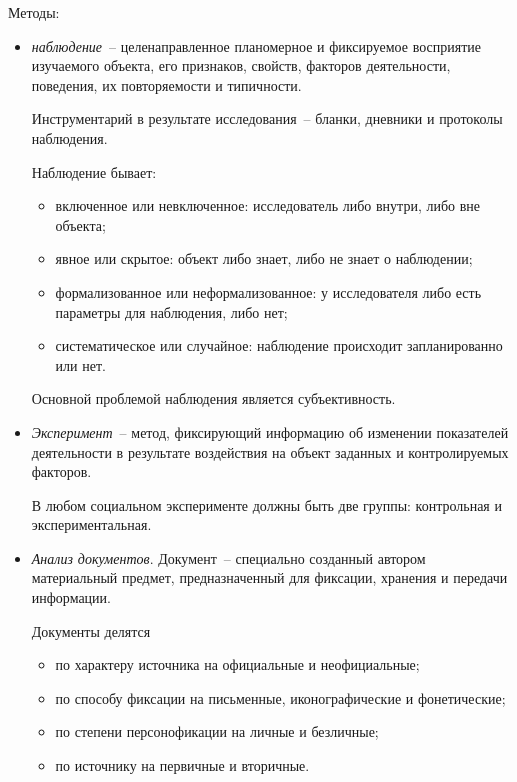   Методы:
  \begin{itemize}
    \item \emph{наблюдение}~-- целенаправленное планомерное и фиксируемое
      восприятие изучаемого объекта, его признаков, свойств, факторов
      деятельности, поведения, их повторяемости и типичности.

      Инструментарий в результате исследования~-- бланки, дневники и протоколы
      наблюдения.

      Наблюдение бывает:
      \begin{itemize}
        \item включенное или невключенное: исследователь либо внутри, либо
          вне объекта;
        \item явное или скрытое: объект либо знает, либо не знает о
          наблюдении;
        \item формализованное или неформализованное: у исследователя либо
          есть параметры для наблюдения, либо нет;
        \item систематическое или случайное: наблюдение происходит
          запланированно или нет.
      \end{itemize}

      Основной проблемой наблюдения является субъективность.

    \item \emph{Эксперимент}~-- метод, фиксирующий информацию об изменении
      показателей деятельности в результате воздействия на объект заданных и
      контролируемых факторов.

      В любом социальном эксперименте должны быть две группы: контрольная и
      экспериментальная.

    \item \emph{Анализ документов}. Документ~-- специально созданный автором
      материальный предмет, предназначенный для фиксации, хранения и передачи
      информации.

      Документы делятся
      \begin{itemize}
        \item по характеру источника на официальные и неофициальные;
        \item по способу фиксации на письменные, иконографические и
          фонетические;
        \item по степени персонофикации на личные и безличные;
        \item по источнику на первичные и вторичные.
      \end{itemize}


\end{itemize}
